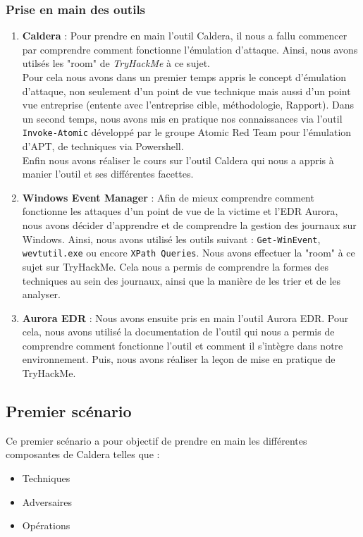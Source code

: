 \documentclass[12pt,letterpaper]{article}
\begin{document}
\subsubsection{Prise en main des outils}
\begin{enumerate}
    \item \textbf{Caldera} : 
    Pour prendre en main l'outil Caldera, il nous a fallu commencer par comprendre comment fonctionne l'émulation d'attaque. Ainsi, nous avons utilsés les "room" de \textit{TryHackMe} à ce sujet. \\

    Pour cela nous avons dans un premier temps appris le concept d'émulation d'attaque, non seulement d'un point de vue technique mais aussi d'un point vue entreprise (entente avec l'entreprise cible, méthodologie, Rapport). Dans un second temps, nous avons mis en pratique nos connaissances via l'outil \verb|Invoke-Atomic| développé par le groupe Atomic Red Team pour l'émulation d'APT, de techniques via Powershell. \\
    Enfin nous avons réaliser le cours sur l'outil Caldera qui nous a appris à manier l'outil et ses différentes facettes. 
    \item \textbf{Windows \- Event Manager} :
    Afin de mieux comprendre comment fonctionne les attaques d'un point de vue de la victime et l'EDR Aurora, nous avons décider d'apprendre et de comprendre la gestion des journaux sur Windows. Ainsi, nous avons utilisé les outils suivant : \verb|Get-WinEvent|, \verb|wevtutil.exe| ou encore \verb|XPath Queries|. Nous avons effectuer la "room" à ce sujet sur TryHackMe. Cela nous a permis de comprendre la formes des techniques au sein des journaux, ainsi que la manière de les trier et de les analyser. \\
    \item \textbf{Aurora EDR} :
    Nous avons ensuite pris en main l'outil Aurora EDR. Pour cela, nous avons utilisé la documentation de l'outil qui nous a permis de comprendre comment fonctionne l'outil et comment il s'intègre dans notre environnement. Puis, nous avons réaliser la leçon de mise en pratique de TryHackMe. \\
\end{enumerate}


\subsection{Premier scénario}
Ce premier scénario a pour objectif de prendre en main les différentes composantes de Caldera telles que :
\begin{itemize}
    \item Techniques
    \item Adversaires
    \item Opérations
\end{itemize}
\end{document}
